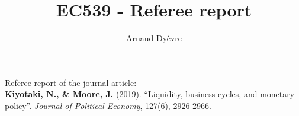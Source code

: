 \documentclass{amsart}
\theoremstyle{definition}
\theoremstyle{remark}
\numberwithin{equation}{section}
\begin{document}
\title{EC539 - Referee report}

\author{Arnaud Dy\`evre}







\maketitle

\begin{center}
\end{center}


\vspace{12pt}

Referee report of the journal article: \\ 
\textbf{Kiyotaki, N., \& Moore, J.} (2019). ``Liquidity, business cycles, and monetary policy''. \textit{Journal of Political Economy}, 127(6), 2926-2966.

\newpage 
\end{document}
